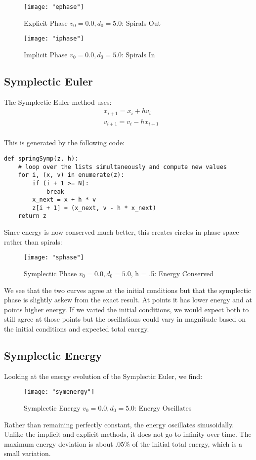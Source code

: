 \documentclass{article}
\begin{document}
\begin{figure}[h!]
	\centering
	\texttt{[image: "ephase"]}
	\caption{Explicit Phase $v_0 = 0.0, d_0 = 5.0$: Spirals Out}
\end{figure} 
\begin{figure}[h!]
	\centering
	\texttt{[image: "iphase"]}
	\caption{Implicit Phase $v_0 = 0.0, d_0 = 5.0$: Spirals In}
\end{figure} 
\FloatBarrier

\subsection{Symplectic Euler}

The Symplectic Euler method uses:
\begin{align*}
	&x_{i+1} = x_i + h v_i\\
	&v_{i+1} = v_i - h x_{i+1}\\
\end{align*}

This is generated by the following code:
\begin{verbatim}
def springSymp(z, h):
    # loop over the lists simultaneously and compute new values
    for i, (x, v) in enumerate(z):
        if (i + 1 >= N):
            break
        x_next = x + h * v
        z[i + 1] = (x_next, v - h * x_next)
    return z
\end{verbatim}

Since energy is now conserved much better, this creates circles in phase space rather than spirals:
\begin{figure}[h!]
	\centering
	\texttt{[image: "sphase"]}
	\caption{Symplectic Phase $v_0 = 0.0, d_0 = 5.0$, h = .5: Energy Conserved}
\end{figure} 
\FloatBarrier

We see that the two curves agree at the initial conditions but that the symplectic phase is slightly askew from the exact result. At points it
has lower energy and at points higher energy. If we varied the initial conditions, we would expect both to still agree at those points but the oscillations
could vary in magnitude based on the initial conditions and expected total energy.
 
 \subsection{Symplectic Energy}
Looking at the energy evolution of the Symplectic Euler, we find: 
\begin{figure}[h!]
	\centering
	\texttt{[image: "symenergy"]}
	\caption{Symplectic Energy $v_0 = 0.0, d_0 = 5.0$: Energy Oscillates}
\end{figure} 
\FloatBarrier

Rather than remaining perfectly constant, the energy oscillates sinusoidally. Unlike the implicit and explicit methods, it does not go
to infinity over time. The maximum energy deviation is about .05\% of the initial total energy, which is a small variation.
\end{document}
